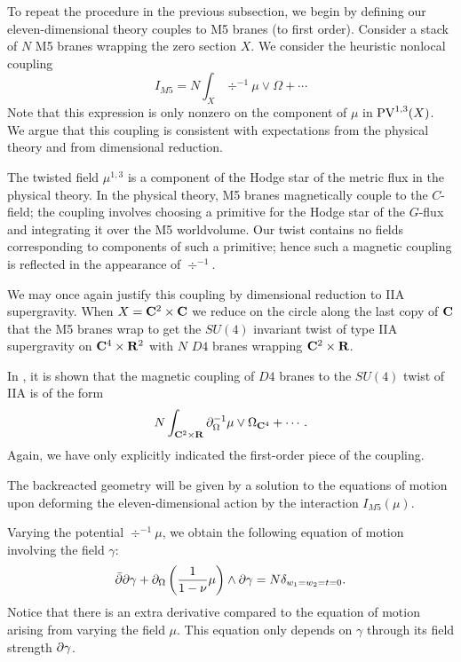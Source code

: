 \documentclass[../main.tex]{subfiles}
\begin{document}

To repeat the procedure in the previous subsection, we begin by defining our eleven-dimensional theory couples to M5 branes (to first order).
Consider a stack of $N$ M5 branes wrapping the zero section $X$. 
We consider the heuristic nonlocal coupling 
\[
I_{M5} = N\int_{X} \div^{-1}\mu \vee \Omega +\cdots 
\]
Note that this expression is only nonzero on the component of $\mu$ in $\text{PV}^{1,3}(X)$. 
We argue that this coupling is consistent with expectations from the physical theory and from dimensional reduction. 

The twisted field $\mu^{1,3}$ is a component of the Hodge star of the metric flux in the physical theory.
In the physical theory, M5 branes magnetically couple to the $C$-field; the coupling involves choosing a primitive for the Hodge star of the $G$-flux and integrating it over the M5 worldvolume. Our twist contains no fields corresponding to components of such a primitive; hence such a magnetic coupling is reflected in the appearance of $\div^{-1}$. 

We may once again justify this coupling by dimensional reduction to IIA supergravity. 
When $X = \mathbf{C}^2 \times \mathbf{C}$ we reduce on the circle along the last copy of $\mathbf{C}$ that the M5 branes wrap to get the $SU(4)$ invariant twist of type IIA supergravity on $\mathbf{C}^4 \times \mathbf{R}^2$ with $N$ $D4$ branes wrapping $\mathbf{C}^2 \times \mathbf{R}$.

In \cite{CLsugra}, it is shown that the magnetic coupling of $D4$ branes to the $SU(4)$ twist of IIA is of the form
\[
N \int _{\mathbf{C}^2 \times \mathbf{R}} \partial_{\Omega}^{-1} \mu \vee \Omega_{\mathbf{C}^4} + \cdots .
\]
Again, we have only explicitly indicated the first-order piece of the coupling. 

\parsec[s:m5backreact]

The backreacted geometry will be given by a solution to the equations of motion upon deforming the eleven-dimensional action by the interaction $I_{M5}(\mu)$.

Varying the potential $\div^{-1} \mu$, we obtain the following equation of motion involving the field $\gamma$:
\begin{equation}\label{eqn:m5eom1}
\bar{\partial} \partial \gamma + \partial_{\Omega} \left(\frac{1}{1-\nu} \mu\right) \wedge \partial \gamma = N \delta_{w_1=w_2=t=0} .
\end{equation}
Notice that there is an extra derivative compared to the equation of motion arising from varying the field $\mu$. 
This equation only depends on $\gamma$ through its field strength $\partial \gamma$.
\end{document}
